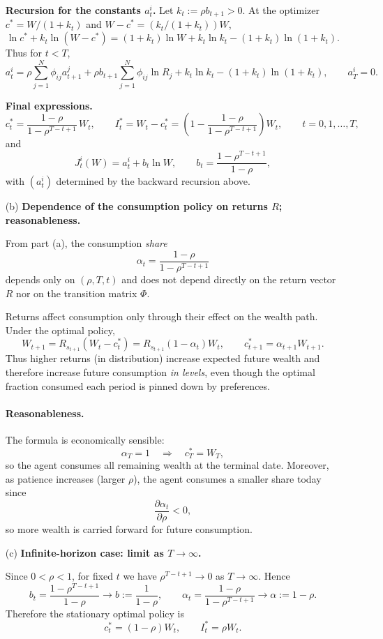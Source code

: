 \documentclass{article}
\begin{document}
\begin{enumerate}
\medskip
\noindent\textbf{Recursion for the constants $a_t^i$.}
Let \(k_t:=\rho b_{t+1}>0\). At the optimizer \(c^*=W/(1+k_t)\) and \(W-c^*=(k_t/(1+k_t))W\),
\[
\ln c^*+k_t\ln(W-c^*)
=
(1+k_t)\ln W
+
k_t\ln k_t
-
(1+k_t)\ln(1+k_t).
\]
Thus for $t<T$,
\[
a_t^i
=
\rho\sum_{j=1}^N\phi_{ij}a_{t+1}^j
+
\rho b_{t+1}\sum_{j=1}^N\phi_{ij}\ln R_j
+
k_t\ln k_t-(1+k_t)\ln(1+k_t),
\qquad
a_T^i=0.
\]

\medskip
\noindent\textbf{Final expressions.}
\[
\boxed{
c_t^*=\frac{1-\rho}{1-\rho^{T-t+1}}\,W_t,
\qquad
I_t^*=W_t-c_t^*=\left(1-\frac{1-\rho}{1-\rho^{T-t+1}}\right)W_t,
\qquad t=0,1,\dots,T,
}
\]
and
\[
\boxed{
J_t^i(W)=a_t^i+b_t\ln W,
\qquad
b_t=\frac{1-\rho^{T-t+1}}{1-\rho},
}
\]
with $(a_t^i)$ determined by the backward recursion above.

\bigskip
\bigskip
\bigskip
\bigskip
\bigskip

\item[(b)] \textbf{Dependence of the consumption policy on returns $R$; reasonableness.}

From part (a), the consumption \emph{share}
\[
\alpha_t=\frac{1-\rho}{1-\rho^{T-t+1}}
\]
depends only on $(\rho,T,t)$ and does not depend directly on the return vector $R$ nor on the transition matrix $\Phi$.

Returns affect consumption only through their effect on the wealth path. Under the optimal policy,
\[
W_{t+1}=R_{s_{t+1}}(W_t-c_t^*)
=
R_{s_{t+1}}(1-\alpha_t)W_t,
\qquad
c_{t+1}^*=\alpha_{t+1}W_{t+1}.
\]
Thus higher returns (in distribution) increase expected future wealth and therefore increase future consumption \emph{in levels}, even though the optimal fraction consumed each period is pinned down by preferences.

\paragraph{Reasonableness.}
The formula is economically sensible:
\[
\alpha_T=1 \quad\Rightarrow\quad c_T^*=W_T,
\]
so the agent consumes all remaining wealth at the terminal date.
Moreover, as patience increases (larger $\rho$), the agent consumes a smaller share today since
\[
\frac{\partial \alpha_t}{\partial \rho}<0,
\]
so more wealth is carried forward for future consumption.

\medskip

\newpage
\item[(c)] \textbf{Infinite-horizon case: limit as $T\to\infty$.}

Since \(0<\rho<1\), for fixed \(t\) we have \(\rho^{T-t+1}\to 0\) as \(T\to\infty\).
Hence
\[
b_t=\frac{1-\rho^{T-t+1}}{1-\rho}\to b:=\frac{1}{1-\rho},
\qquad
\alpha_t=\frac{1-\rho}{1-\rho^{T-t+1}}\to \alpha:=1-\rho.
\]
Therefore the stationary optimal policy is
\[
\boxed{
c_t^*=(1-\rho)W_t,
\qquad
I_t^*=\rho W_t.
}
\]


\end{enumerate}
\end{document}
